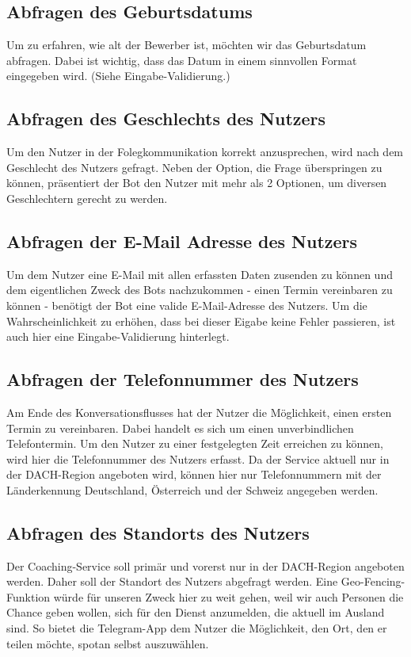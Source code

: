         \subsection{Abfragen des Geburtsdatums}    
            Um zu erfahren, wie alt der Bewerber ist, möchten wir das Geburtsdatum abfragen. Dabei ist wichtig, dass das Datum in einem sinnvollen Format eingegeben wird. (Siehe Eingabe-Validierung.)
        
        \subsection{Abfragen des Geschlechts des Nutzers}
            Um den Nutzer in der Folegkommunikation korrekt anzusprechen, wird nach dem Geschlecht des Nutzers gefragt. Neben der Option, die Frage überspringen zu können, präsentiert der Bot den Nutzer mit mehr als 2 Optionen, um diversen Geschlechtern gerecht zu werden.
        
        \subsection{Abfragen der E-Mail Adresse des Nutzers}
            Um dem Nutzer eine E-Mail mit allen erfassten Daten zusenden zu können und dem eigentlichen Zweck des Bots nachzukommen - einen Termin vereinbaren zu können - benötigt der Bot eine valide E-Mail-Adresse des Nutzers. Um die Wahrscheinlichkeit zu erhöhen, dass bei dieser Eigabe keine Fehler passieren, ist auch hier eine Eingabe-Validierung hinterlegt.
        
        \subsection{Abfragen der Telefonnummer des Nutzers}
            Am Ende des Konversationsflusses hat der Nutzer die Möglichkeit, einen ersten Termin zu vereinbaren. Dabei handelt es sich um einen unverbindlichen Telefontermin. Um den Nutzer zu einer festgelegten Zeit erreichen zu können, wird hier die Telefonnummer des Nutzers erfasst. Da der Service aktuell nur in der DACH-Region angeboten wird, können hier nur Telefonnummern mit der Länderkennung Deutschland, Österreich und der Schweiz angegeben werden. 
        
        \subsection{Abfragen des Standorts des Nutzers}
            Der Coaching-Service soll primär und vorerst nur in der DACH-Region angeboten werden. Daher soll der Standort des Nutzers abgefragt werden. Eine Geo-Fencing-Funktion würde für unseren Zweck hier zu weit gehen, weil wir auch Personen die Chance geben wollen, sich für den Dienst anzumelden, die aktuell im Ausland sind. So bietet die Telegram-App dem Nutzer die Möglichkeit, den Ort, den er teilen möchte, spotan selbst auszuwählen.
        

